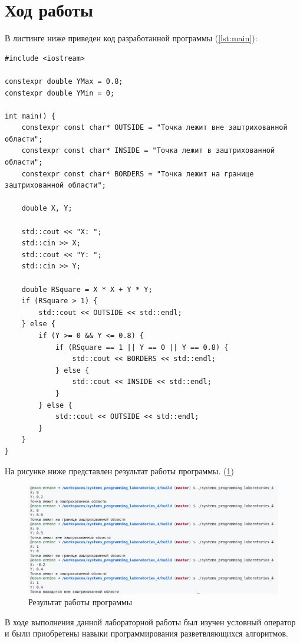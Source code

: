 \documentclass[14pt]{extarticle}
\makeatletter
\newenvironment{code}{\captionsetup{type=listing, belowskip=-14pt plus 3pt minus 0pt}}{}
\newcounter{sectionc} %
\newcommand{\numbersections}{\renewcommand{\Hy@numberline}[1]{##1~}}
\newcommand{\nonumbersections}{\renewcommand{\Hy@numberline}[1]{}}
\let\oldsection\section
\renewcommand{\section}{\numbersections\oldsection}
\let\oldsectionc\sectionc
\renewcommand{\sectionc}{\nonumbersections\oldsectionc}
\makeatother
\begin{document}
\section{Ход работы}

В листинге ниже приведен код разработанной программы (\ref{lst:main}):

\begin{code}    
\caption{Код программы\label{lst:main}}
\begin{verbatim}
#include <iostream>

constexpr double YMax = 0.8;
constexpr double YMin = 0;

int main() {
    constexpr const char* OUTSIDE = "Точка лежит вне заштрихованной области";
    constexpr const char* INSIDE = "Точка лежит в заштрихованной области";
    constexpr const char* BORDERS = "Точка лежит на границе заштрихованной области";
    
    double X, Y;

    std::cout << "X: ";
    std::cin >> X;
    std::cout << "Y: ";
    std::cin >> Y;

    double RSquare = X * X + Y * Y;
    if (RSquare > 1) {
        std::cout << OUTSIDE << std::endl;
    } else {
        if (Y >= 0 && Y <= 0.8) {
            if (RSquare == 1 || Y == 0 || Y == 0.8) {
                std::cout << BORDERS << std::endl;
            } else {
                std::cout << INSIDE << std::endl;
            }
        } else {
            std::cout << OUTSIDE << std::endl;
        }
    }
}
\end{verbatim}
\end{code}

На рисунке ниже представлен результат работы программы. (\ref{img:res})

\begin{figure}[H]
    \centering
    \includegraphics[width=1.0\linewidth]{res.png}
    \caption{Результат работы программы\label{img:res}}
\end{figure}


В ходе выполнения данной лабораторной работы был изучен условный оператор и были приобретены навыки программирования разветвляющихся алгоритмов.
\end{document}

